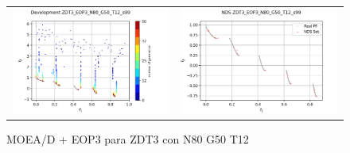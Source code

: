 \begin{figure}[H]
\begin{tabular}{c c}
    \includegraphics[scale=0.5]{figures/ZDT3_EOP3_N80_G50_T12/s99_dev.png} &
    \includegraphics[scale=0.5]{figures/ZDT3_EOP3_N80_G50_T12/s99_nds.png}\\
    \end{tabular}
    \caption{MOEA/D + EOP3 para ZDT3 con N80 G50 T12 }
    \label{fig:8}
\end{figure}

